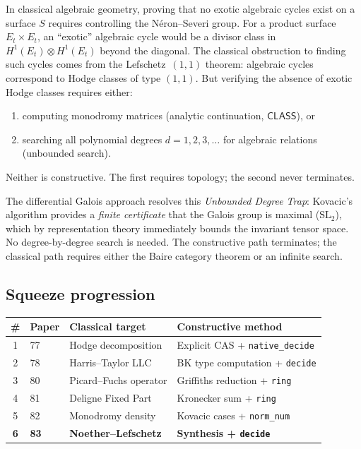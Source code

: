 \documentclass[11pt]{article}
\theoremstyle{plain}
\theoremstyle{definition}
\theoremstyle{remark}
\newcommand{\SL}{\mathrm{SL}}
\newcommand{\CLASS}{\mathsf{CLASS}}
\begin{document}
In classical algebraic geometry, proving that no exotic algebraic cycles exist on a surface $S$ requires controlling the N\'eron--Severi group.
For a product surface $E_t \times E_t$, an ``exotic'' algebraic cycle would be a divisor class in $H^1(E_t) \otimes H^1(E_t)$ beyond the diagonal.
The classical obstruction to finding such cycles comes from the Lefschetz~$(1,1)$ theorem: algebraic cycles correspond to Hodge classes of type $(1,1)$.
But verifying the absence of exotic Hodge classes requires either:
\begin{enumerate}[label=(\alph*)]
  \item computing monodromy matrices (analytic continuation, $\CLASS$), or
  \item searching all polynomial degrees $d = 1, 2, 3, \ldots$ for algebraic relations (unbounded search).
\end{enumerate}
Neither is constructive.
The first requires topology; the second never terminates.

The differential Galois approach resolves this \emph{Unbounded Degree Trap}: Kovacic's algorithm provides a \emph{finite certificate} that the Galois group is maximal ($\SL_2$), which by representation theory immediately bounds the invariant tensor space.
No degree-by-degree search is needed.
The constructive path terminates; the classical path requires either the Baire category theorem or an infinite search.

\subsection{Squeeze progression}

\begin{center}
\renewcommand{\arraystretch}{1.1}
\begin{tabular}{@{}clll@{}}
\toprule
\# & Paper & Classical target & Constructive method \\
\midrule
1 & 77 & Hodge decomposition & Explicit CAS + \texttt{native\_decide} \\
2 & 78 & Harris--Taylor LLC & BK type computation + \texttt{decide} \\
3 & 80 & Picard--Fuchs operator & Griffiths reduction + \texttt{ring} \\
4 & 81 & Deligne Fixed Part & Kronecker sum + \texttt{ring} \\
5 & 82 & Monodromy density & Kovacic cases + \texttt{norm\_num} \\
\textbf{6} & \textbf{83} & \textbf{Noether--Lefschetz} & \textbf{Synthesis + \texttt{decide}} \\
\bottomrule
\end{tabular}
\end{center}
\end{document}
